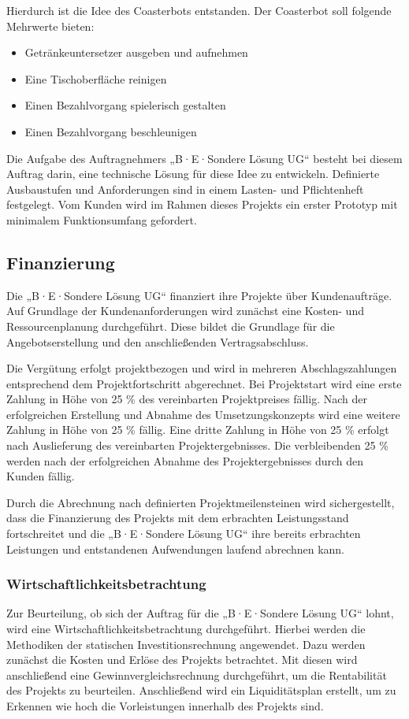 \documentclass[
  a4paper,
  12pt,
  DIV=12,        %
  parskip=half,  %
  headings=small %
]{scrartcl}
\theoremstyle{definition}
\providecommand{\tightlist}{%
  \setlength{\itemsep}{0pt}\setlength{\parskip}{0pt}}
\theoremstyle{definition}
\begin{document}
Hierdurch ist die Idee des Coasterbots entstanden. Der Coasterbot soll
folgende Mehrwerte bieten:

\begin{itemize}
\tightlist
\item
  Getränkeuntersetzer ausgeben und aufnehmen
\item
  Eine Tischoberfläche reinigen
\item
  Einen Bezahlvorgang spielerisch gestalten
\item
  Einen Bezahlvorgang beschleunigen
\end{itemize}

Die Aufgabe des Auftragnehmers „B·E·Sondere Lösung UG`` besteht bei
diesem Auftrag darin, eine technische Lösung für diese Idee zu
entwickeln. Definierte Ausbaustufen und Anforderungen sind in einem
Lasten- und Pflichtenheft festgelegt. Vom Kunden wird im Rahmen dieses
Projekts ein erster Prototyp mit minimalem Funktionsumfang gefordert.

\subsection{Finanzierung}\label{finanzierung}

Die „B·E·Sondere Lösung UG`` finanziert ihre Projekte über
Kundenaufträge. Auf Grundlage der Kundenanforderungen wird zunächst eine
Kosten- und Ressourcenplanung durchgeführt. Diese bildet die Grundlage
für die Angebotserstellung und den anschließenden Vertragsabschluss.

Die Vergütung erfolgt projektbezogen und wird in mehreren
Abschlagszahlungen entsprechend dem Projektfortschritt abgerechnet. Bei
Projektstart wird eine erste Zahlung in Höhe von 25 \% des vereinbarten
Projektpreises fällig. Nach der erfolgreichen Erstellung und Abnahme des
Umsetzungskonzepts wird eine weitere Zahlung in Höhe von 25 \% fällig.
Eine dritte Zahlung in Höhe von 25 \% erfolgt nach Auslieferung des
vereinbarten Projektergebnisses. Die verbleibenden 25 \% werden nach der
erfolgreichen Abnahme des Projektergebnisses durch den Kunden fällig.

Durch die Abrechnung nach definierten Projektmeilensteinen wird
sichergestellt, dass die Finanzierung des Projekts mit dem erbrachten
Leistungsstand fortschreitet und die „B·E·Sondere Lösung UG`` ihre
bereits erbrachten Leistungen und entstandenen Aufwendungen laufend
abrechnen kann.

\subsubsection{Wirtschaftlichkeitsbetrachtung}\label{Rentabilitaet}
Zur Beurteilung, ob sich der Auftrag für die „B·E·Sondere Lösung UG`` lohnt, wird eine Wirtschaftlichkeitsbetrachtung durchgeführt. Hierbei werden die Methodiken der statischen Investitionsrechnung angewendet. Dazu werden zunächst die Kosten und Erlöse des Projekts betrachtet. Mit diesen wird anschließend eine Gewinnvergleichsrechnung durchgeführt, um die Rentabilität des Projekts zu beurteilen. Anschließend wird ein Liquiditätsplan erstellt, um zu Erkennen wie hoch die Vorleistungen innerhalb des Projekts sind.\cite{Niemann2019Investitionsrechnung}\cite{BibEntry2026Aug}
\end{document}
